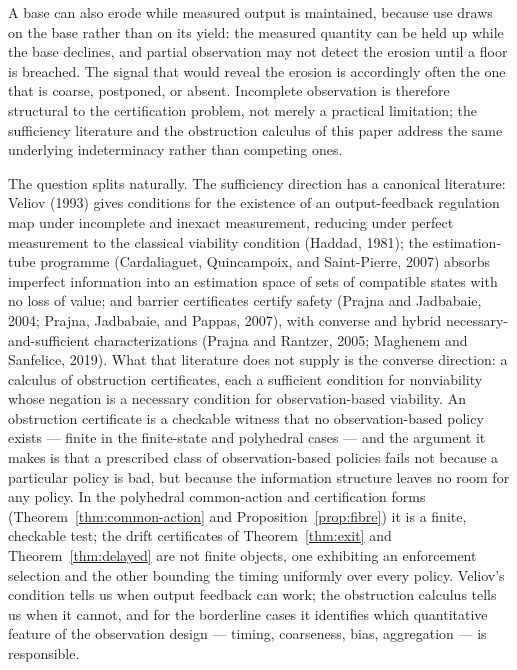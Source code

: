 \documentclass[10pt,twocolumn]{article}
\theoremstyle{definition}
\begin{document}
A base can also erode while measured output is maintained, because
use draws on the base rather than on its yield: the measured quantity
can be held up while the base declines, and partial observation may
not detect the erosion until a floor is breached. The signal that would reveal the erosion is
accordingly often the one that is coarse, postponed, or absent.
Incomplete observation is therefore structural to the certification
problem, not merely a practical limitation; the sufficiency literature
and the obstruction calculus of this paper address the same underlying
indeterminacy rather than competing ones.

The question splits naturally. The sufficiency direction has a canonical literature: Veliov (1993) gives conditions for the existence of an output-feedback regulation map under incomplete and inexact measurement, reducing under perfect measurement to the classical viability condition (Haddad, 1981); the estimation-tube programme (Cardaliaguet, Quincampoix, and Saint-Pierre, 2007) absorbs imperfect information into an estimation space of sets of compatible states with no loss of value; and barrier certificates certify safety (Prajna and Jadbabaie, 2004; Prajna, Jadbabaie, and Pappas, 2007), with converse and hybrid necessary-and-sufficient characterizations (Prajna and Rantzer, 2005; Maghenem and Sanfelice, 2019). What that literature does not supply is the converse direction: a calculus of obstruction certificates, each a sufficient condition for nonviability whose negation is a necessary condition for observation-based viability. An obstruction certificate is a checkable witness that no observation-based policy exists --- finite in the finite-state and polyhedral cases --- and the argument it makes is that a prescribed class of observation-based policies fails not because a particular policy is bad, but because the information structure leaves no room for any policy. In the polyhedral common-action and certification forms (Theorem~\ref{thm:common-action} and Proposition~\ref{prop:fibre}) it is a finite, checkable test; the drift certificates of Theorem~\ref{thm:exit} and Theorem~\ref{thm:delayed} are not finite objects, one exhibiting an enforcement selection and the other bounding the timing uniformly over every policy. Veliov's condition tells us when output feedback can work; the obstruction calculus tells us when it cannot, and for the borderline cases it identifies which quantitative feature of the observation design --- timing, coarseness, bias, aggregation --- is responsible.
\end{document}
